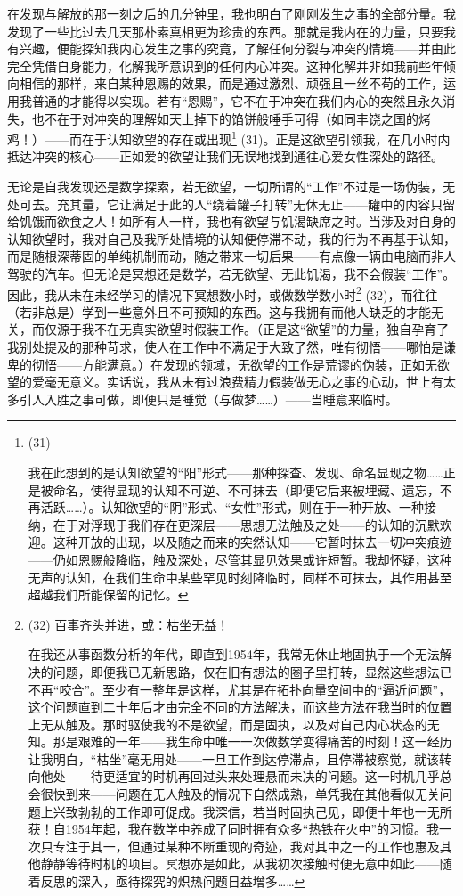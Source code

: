 在发现与解放的那一刻之后的几分钟里，我也明白了刚刚发生之事的全部分量。我发现了一些比过去几天那朴素真相更为珍贵的东西。那就是我内在的力量，只要我有兴趣，便能探知我内心发生之事的究竟，了解任何分裂与冲突的情境——并由此完全凭借自身能力，化解我所意识到的任何内心冲突。这种化解并非如我前些年倾向相信的那样，来自某种恩赐的效果，而是通过激烈、顽强且一丝不苟的工作，运用我普通的才能得以实现。若有“恩赐”，它不在于冲突在我们内心的突然且永久消失，也不在于对冲突的理解如天上掉下的馅饼般唾手可得（如同丰饶之国的烤鸡！）——而在于认知欲望的存在或出现\footnote{(31)\par 我在此想到的是认知欲望的“阳”形式——那种探查、发现、命名显现之物……正是被命名，使得显现的认知不可逆、不可抹去（即便它后来被埋藏、遗忘，不再活跃……）。认知欲望的“阴”形式、“女性”形式，则在于一种开放、一种接纳，在于对浮现于我们存在更深层——思想无法触及之处——的认知的沉默欢迎。这种开放的出现，以及随之而来的突然认知——它暂时抹去一切冲突痕迹——仍如恩赐般降临，触及深处，尽管其显见效果或许短暂。我却怀疑，这种无声的认知，在我们生命中某些罕见时刻降临时，同样不可抹去，其作用甚至超越我们所能保留的记忆。} (31)。正是这欲望引领我，在几小时内抵达冲突的核心——正如爱的欲望让我们无误地找到通往心爱女性深处的路径。

无论是自我发现还是数学探索，若无欲望，一切所谓的“工作”不过是一场伪装，无处可去。充其量，它让满足于此的人“绕着罐子打转”无休无止——罐中的内容只留给饥饿而欲食之人！如所有人一样，我也有欲望与饥渴缺席之时。当涉及对自身的认知欲望时，我对自己及我所处情境的认知便停滞不动，我的行为不再基于认知，而是随根深蒂固的单纯机制而动，随之带来一切后果——有点像一辆由电脑而非人驾驶的汽车。但无论是冥想还是数学，若无欲望、无此饥渴，我不会假装“工作”。因此，我从未在未经学习的情况下冥想数小时，或做数学数小时\footnote{(32) 百事齐头并进，或：枯坐无益！

在我还从事函数分析的年代，即直到1954年，我常无休止地固执于一个无法解决的问题，即便我已无新思路，仅在旧有想法的圈子里打转，显然这些想法已不再“咬合”。至少有一整年是这样，尤其是在拓扑向量空间中的“逼近问题”，这个问题直到二十年后才由完全不同的方法解决，而这些方法在我当时的位置上无从触及。那时驱使我的不是欲望，而是固执，以及对自己内心状态的无知。那是艰难的一年——我生命中唯一一次做数学变得痛苦的时刻！这一经历让我明白，“枯坐”毫无用处——一旦工作到达停滞点，且停滞被察觉，就该转向他处——待更适宜的时机再回过头来处理悬而未决的问题。这一时机几乎总会很快到来——问题在无人触及的情况下自然成熟，单凭我在其他看似无关问题上兴致勃勃的工作即可促成。我深信，若当时固执己见，即便十年也一无所获！自1954年起，我在数学中养成了同时拥有众多“热铁在火中”的习惯。我一次只专注于其一，但通过某种不断重现的奇迹，我对其中之一的工作也惠及其他静静等待时机的项目。冥想亦是如此，从我初次接触时便无意中如此——随着反思的深入，亟待探究的炽热问题日益增多……} (32)，而往往（若非总是）学到一些意外且不可预知的东西。这与我拥有而他人缺乏的才能无关，而仅源于我不在无真实欲望时假装工作。（正是这“欲望”的力量，独自孕育了我别处提及的那种苛求，使人在工作中不满足于大致了然，唯有彻悟——哪怕是谦卑的彻悟——方能满意。）在发现的领域，无欲望的工作是荒谬的伪装，正如无欲望的爱毫无意义。实话说，我从未有过浪费精力假装做无心之事的心动，世上有太多引人入胜之事可做，即便只是睡觉（与做梦……）——当睡意来临时。


